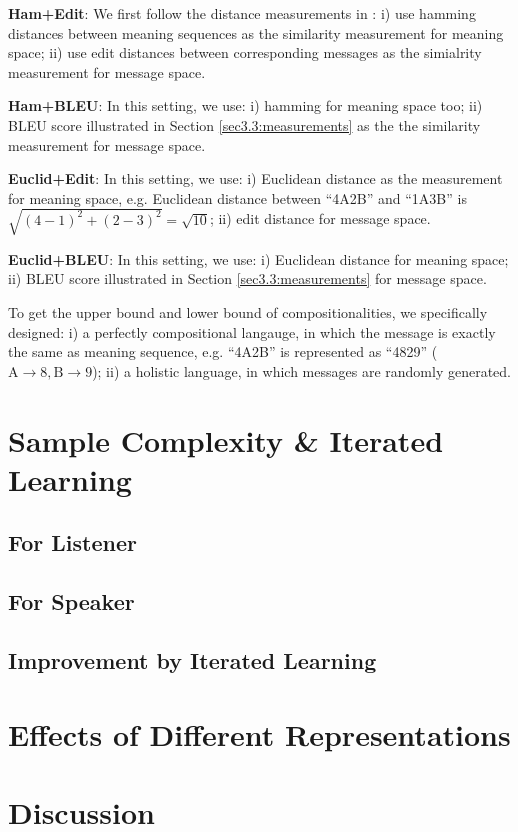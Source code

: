\noindent\textbf{Ham+Edit}: We first follow the distance measurements in \cite{brighton2006understanding}: i) use hamming distances between meaning sequences as the similarity measurement for meaning space; ii) use edit distances between corresponding messages as the simialrity measurement for message space.

\noindent\textbf{Ham+BLEU}: In this setting, we use: i) hamming for meaning space too; ii) BLEU score illustrated in Section \ref{sec3.3:measurements} as the the similarity measurement for message space.

\noindent\textbf{Euclid+Edit}: In this setting, we use: i) Euclidean distance as the measurement for meaning space, e.g. Euclidean distance between ``4A2B'' and ``1A3B'' is $\sqrt{(4-1)^2 + (2-3)^2}=\sqrt{10}$; ii) edit distance for message space.

\noindent\textbf{Euclid+BLEU}: In this setting, we use: i) Euclidean distance for meaning space; ii) BLEU score illustrated in Section \ref{sec3.3:measurements} for message space.

To get the upper bound and lower bound of compositionalities, we specifically designed: i) a perfectly compositional langauge, in which the message is exactly the same as meaning sequence, e.g. ``4A2B'' is represented as ``4829'' ($\mbox{A}\rightarrow 8, \mbox{B} \rightarrow 9$); ii) a holistic language, in which messages are randomly generated.

\section{Sample Complexity \& Iterated Learning}
\label{sec4.3:sample_complexity}

\subsection{For Listener}
\label{ssec4.3.1:learning_listener}

\subsection{For Speaker}
\label{ssec4.3.2:learning_speaker}

\subsection{Improvement by Iterated Learning}
\label{ssec4.3.:iterated_learning_improve}

\section{Effects of Different Representations}
\label{sec4.4:represent_effect}

\section{Discussion}
\label{sec4.5:discuss}